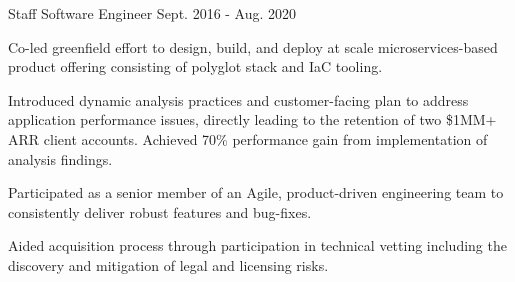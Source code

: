 \begin{cventries}
  \cventry
    {Staff Software Engineer} %
    {} %
    {} %
    {Sept. 2016 - Aug. 2020} %
    {
      \begin{cvitems} %
        \item {Co-led greenfield effort to design, build, and deploy at scale microservices-based product offering consisting of polyglot stack and IaC tooling.}
        \item {Introduced dynamic analysis practices and customer-facing plan to address application performance issues, directly leading to the retention of two \$1MM+ ARR client accounts. Achieved 70\% performance gain from implementation of analysis findings.}
        \item {Participated as a senior member of an Agile, product-driven engineering team to consistently deliver robust features and bug-fixes.}
        \item {Aided acquisition process through participation in technical vetting including the discovery and mitigation of legal and licensing risks.}
      \end{cvitems}
    }
    


\end{cventries}
